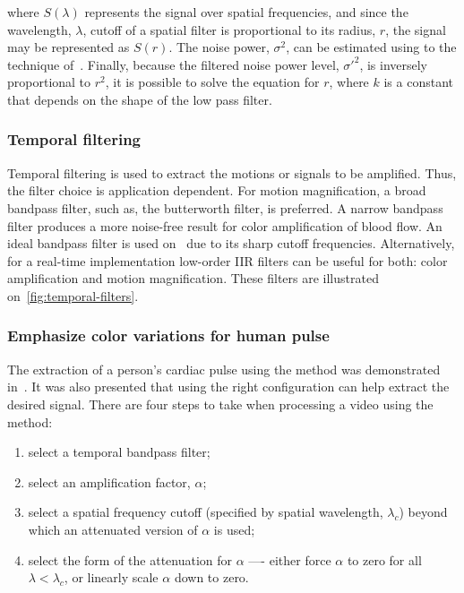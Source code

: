 where $S(\lambda)$ represents the signal over spatial frequencies, and since
the wavelength, $\lambda$, cutoff of a spatial filter is proportional to its
radius, $r$, the signal may be represented as $S(r)$. The noise power,
$\sigma^2$, can be estimated using to the technique of~\cite{Liu2006Noise}.
Finally, because the filtered noise power level, $\sigma'^2$, is inversely
proportional to $r^2$, it is possible to solve the equation for $r$, where
$k$ is a constant that depends on the shape of the low pass filter.

\subsubsection{Temporal filtering} \label{sec:sota:post:evm:temporal}


Temporal filtering is used to extract the motions or signals to be amplified.
Thus, the filter choice is application dependent. For motion magnification,
a broad bandpass filter, such as, the butterworth filter, is preferred. A
narrow bandpass filter produces a more noise-free result for color
amplification of blood flow. An ideal bandpass filter is used
on~\cite{Wu2012Eulerian} due to its sharp cutoff frequencies. Alternatively,
for a real-time implementation low-order IIR filters can be useful for both:
color amplification and motion magnification. These filters are illustrated
on~\ref{fig:temporal-filters}.

\subsubsection{Emphasize color variations for human pulse} \label{sec:sota:evm:color}


The extraction of a person's cardiac pulse using the \evm{} method
was demonstrated in~\cite{Wu2012Eulerian}. It was also presented that
using the right configuration can help extract the desired signal.
There are four steps to take when processing a video using the \evm{} method:

\begin{enumerate}
  \item select a temporal bandpass filter;
  \item select an amplification factor, $\alpha$;
  \item select a spatial frequency cutoff (specified by spatial wavelength,
        $\lambda_c$) beyond which an attenuated version of $\alpha$ is used;
  \item select the form of the attenuation for $\alpha$ —- either force
        $\alpha$ to zero for all $\lambda < \lambda_c$, or linearly scale
        $\alpha$ down to zero.
\end{enumerate}


